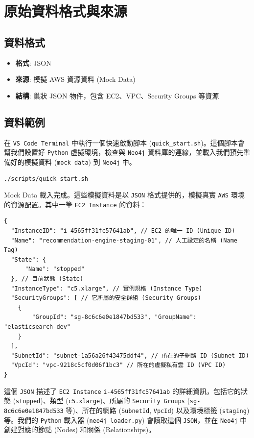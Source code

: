 \documentclass[11pt,a4paper]{ctexart}
\begin{document}
\section{原始資料格式與來源}

\subsection{資料格式}
\begin{itemize}[leftmargin=1.5em]
\item \textbf{格式}: JSON
\item \textbf{來源}: 模擬 AWS 資源資料 (Mock Data)
\item \textbf{結構}: 巢狀 JSON 物件，包含 EC2、VPC、Security Groups 等資源
\end{itemize}

\subsection{資料範例}

在 \texttt{VS Code Terminal} 中執行一個快速啟動腳本 (\texttt{quick\_start.sh})。這個腳本會幫我們設置好 \texttt{Python} 虛擬環境，檢查與 \texttt{Neo4j} 資料庫的連線，並載入我們預先準備好的模擬資料 (\texttt{mock data}) 到 \texttt{Neo4j} 中。

\begin{lstlisting}[language=bash, caption={快速啟動腳本}]
./scripts/quick_start.sh
\end{lstlisting}

Mock Data 載入完成。這些模擬資料是以 \texttt{JSON} 格式提供的，模擬真實 \texttt{AWS} 環境的資源配置。其中一筆 \texttt{EC2 Instance} 的資料：

\begin{lstlisting}[style=json, caption={EC2 Instance 資料範例}]
{
  "InstanceID": "i-4565ff31fc57641ab", // EC2 的唯一 ID (Unique ID)
  "Name": "recommendation-engine-staging-01", // 人工設定的名稱 (Name Tag)
  "State": { 
      "Name": "stopped" 
  }, // 目前狀態 (State)
  "InstanceType": "c5.xlarge", // 實例規格 (Instance Type)
  "SecurityGroups": [ // 它所屬的安全群組 (Security Groups)
    { 
        "GroupId": "sg-8c6c6e0e1847bd533", "GroupName": "elasticsearch-dev" 
    }
  ],
  "SubnetId": "subnet-1a56a26f43475ddf4", // 所在的子網路 ID (Subnet ID)
  "VpcId": "vpc-9218c5cf0d06f1bc3" // 所在的虛擬私有雲 ID (VPC ID)
}
\end{lstlisting}

這個 \texttt{JSON} 描述了 \texttt{EC2 Instance} \texttt{i-4565ff31fc57641ab} 的詳細資訊，包括它的狀態 (\texttt{stopped})、類型 (\texttt{c5.xlarge})、所屬的 \texttt{Security Groups} (\texttt{sg-8c6c6e0e1847bd533} 等)、所在的網路 (\texttt{SubnetId}, \texttt{VpcId}) 以及環境標籤 (\texttt{staging}) 等。我們的 \texttt{Python} 載入器 (\texttt{neo4j\_loader.py}) 會讀取這個 \texttt{JSON}，並在 \texttt{Neo4j} 中創建對應的節點 (Nodes) 和關係 (Relationships)。
\end{document}
